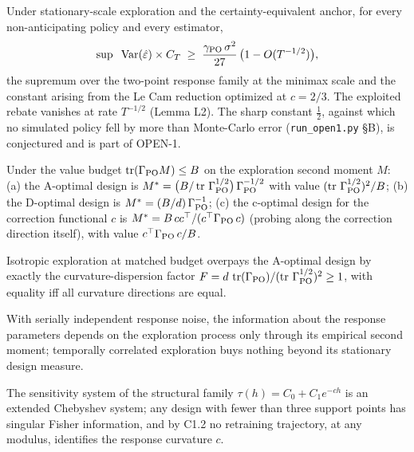 \documentclass[11pt]{article}
\begin{document}
\begin{theorem}
Under stationary-scale exploration and the certainty-equivalent anchor,
for every non-anticipating policy and every estimator,
\[
\sup\;\;\operatorname{Var}(\hat{\varepsilon})\times C_T \;\ge\; \frac{\gamma_{\mathrm{PO}}\,\sigma^2}{27}\,
\big(1 - O(T^{-1/2})\big),
\]
the supremum over the two-point response family at the minimax scale and
the constant arising from the Le Cam reduction optimized at $c = 2/3$.
The exploited rebate vanishes at rate $T^{-1/2}$ (Lemma L2). The sharp
constant $\tfrac{1}{2}$, against which no simulated policy fell by more
than Monte-Carlo error (\texttt{run\_open1.py} \S B), is conjectured and
is part of OPEN-1.
\end{theorem}

\begin{theorem}
Under the value budget $\operatorname{tr}(\Gamma_{\mathrm{PO}} M) \le B$ on the exploration second
moment $M$:
(a) the A-optimal design is $M^{*} = \big(B/\operatorname{tr}\,\Gamma_{\mathrm{PO}}^{1/2}\big)\,
\Gamma_{\mathrm{PO}}^{-1/2}$ with value $(\operatorname{tr}\,\Gamma_{\mathrm{PO}}^{1/2})^2/B$;
(b) the D-optimal design is $M^{*} = (B/d)\,\Gamma_{\mathrm{PO}}^{-1}$;
(c) the c-optimal design for the correction functional $c$ is
$M^{*} = B\,cc^\top/(c^\top \Gamma_{\mathrm{PO}}\, c)$ (probing along the correction
direction itself), with value $c^\top \Gamma_{\mathrm{PO}}\, c / B$.
\end{theorem}

\begin{corollary}
Isotropic exploration at matched budget overpays the A-optimal design by
exactly the curvature-dispersion factor
$F = d\,\operatorname{tr}(\Gamma_{\mathrm{PO}})/(\operatorname{tr}\,\Gamma_{\mathrm{PO}}^{1/2})^2 \ge 1$, with equality iff all
curvature directions are equal.
\end{corollary}

\begin{lemma}
With serially independent response noise, the information about the
response parameters depends on the exploration process only through its
empirical second moment; temporally correlated exploration buys nothing
beyond its stationary design measure.
\end{lemma}

\begin{theorem}
The sensitivity system of the structural family
$\tau(h) = C_0 + C_1 e^{-ch}$ is an extended Chebyshev system; any design
with fewer than three support points has singular Fisher information, and
by C1.2 no retraining trajectory, at any modulus, identifies the response
curvature $c$.
\end{theorem}
\end{document}
